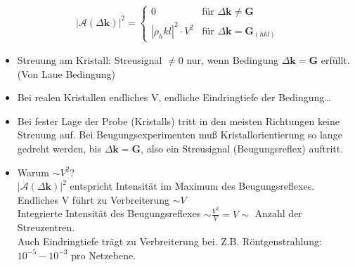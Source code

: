 \begin{align*}
    \left| \mathcal{A} ( \Delta \textbf{k}) \right| ^2 = \begin{cases}
        0 & \text{für } \Delta \textbf{k} \neq \textbf{G}\\
        \left| \rho_hkl\right|^2 \cdot V^2 &  \text{für } \Delta \textbf{k} = \textbf{G}_{(hkl)}
    \end{cases}
\end{align*}
\begin{itemize}
    \item Streuung am Kristall: Streusignal $\neq 0$ nur, wenn Bedingung $\Delta \textbf{k} = \textbf{G}$ erfüllt. (Von Laue Bedingung)
    \item Bei realen Kristallen endliches V, endliche Eindringtiefe der Bedingung\dots
    \item Bei fester Lage der Probe (Kristalls) tritt in den meisten Richtungen keine Streuung auf. Bei Beugungsexperimenten muß Kristallorientierung so lange gedreht werden, bis $\Delta \textbf{k} = \textbf{G}$, also ein Streusignal (Beugungsreflex) auftritt.
    \item Warum $\sim V^2$?\\
    $|\mathcal{A}(\Delta \textbf{k})|^2$ entspricht Intensität im Maximum des Beugungsreflexes. Endliches V führt zu Verbreiterung $\sim V$\\
    Integrierte Intensität des Beugungsreflexes $\sim \frac{V^2}{V} = V \sim$ Anzahl der Streuzentren.\\
    Auch Eindringtiefe trägt zu Verbreiterung bei. Z.B. Röntgenstrahlung: $10^{-5}-10^{-3}$ pro Netzebene.
\end{itemize}

